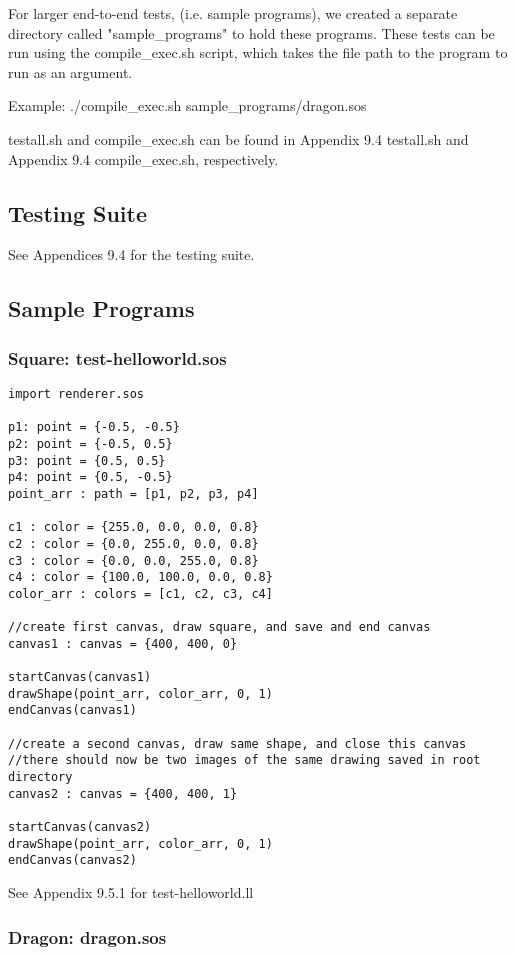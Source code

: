 \documentclass[main.tex]{subfiles}
\begin{document}
	For larger end-to-end tests, (i.e. sample programs), we created a separate directory called "sample\_programs" to hold these programs. These tests can be run using the compile\_exec.sh script, which takes the file path to the program to run as an argument.
	
	Example: ./compile\_exec.sh sample\_programs/dragon.sos
	
	testall.sh and compile\_exec.sh can be found in Appendix 9.4 testall.sh and Appendix 9.4 compile\_exec.sh, respectively. 
	
    \subsection{Testing Suite}
    
    See Appendices 9.4 for the testing suite.
    
	\subsection{Sample Programs}

	\subsubsection{Square: test-helloworld.sos}
	\begin{lstlisting}
import renderer.sos

p1: point = {-0.5, -0.5}
p2: point = {-0.5, 0.5}
p3: point = {0.5, 0.5}
p4: point = {0.5, -0.5}
point_arr : path = [p1, p2, p3, p4] 

c1 : color = {255.0, 0.0, 0.0, 0.8}
c2 : color = {0.0, 255.0, 0.0, 0.8}
c3 : color = {0.0, 0.0, 255.0, 0.8}
c4 : color = {100.0, 100.0, 0.0, 0.8}
color_arr : colors = [c1, c2, c3, c4] 

//create first canvas, draw square, and save and end canvas
canvas1 : canvas = {400, 400, 0}

startCanvas(canvas1)
drawShape(point_arr, color_arr, 0, 1)
endCanvas(canvas1)

//create a second canvas, draw same shape, and close this canvas
//there should now be two images of the same drawing saved in root directory
canvas2 : canvas = {400, 400, 1}

startCanvas(canvas2)
drawShape(point_arr, color_arr, 0, 1)
endCanvas(canvas2)
\end{lstlisting}

See Appendix 9.5.1 for test-helloworld.ll

\subsubsection{Dragon: dragon.sos}
\end{document}
